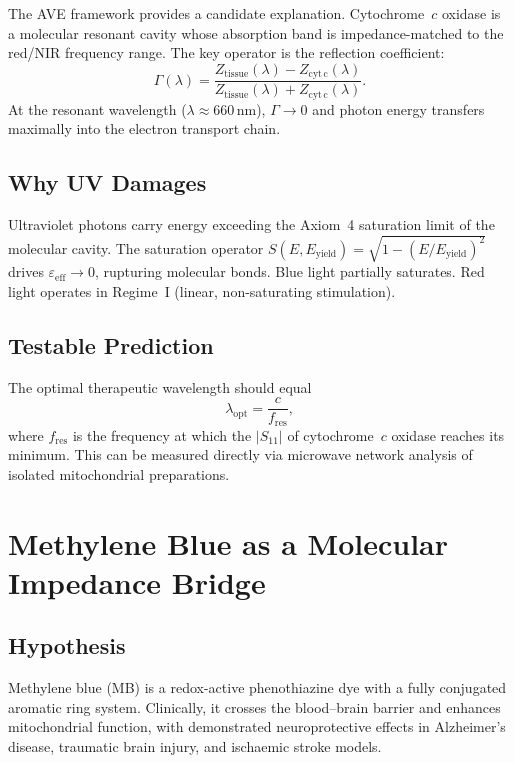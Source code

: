 The AVE framework provides a candidate explanation.  Cytochrome~$c$
oxidase is a molecular resonant cavity whose absorption band is
impedance-matched to the red/NIR frequency range.  The key operator
is the reflection coefficient:
\begin{equation}
  \Gamma(\lambda)
  = \frac{Z_{\mathrm{tissue}}(\lambda) - Z_{\mathrm{cyt\,c}}(\lambda)}
         {Z_{\mathrm{tissue}}(\lambda) + Z_{\mathrm{cyt\,c}}(\lambda)}.
\end{equation}
At the resonant wavelength ($\lambda \approx 660$\,nm), $\Gamma
\to 0$ and photon energy transfers maximally into the electron
transport chain.

\subsection{Why UV Damages}

Ultraviolet photons carry energy exceeding the Axiom~4 saturation
limit of the molecular cavity.  The saturation operator
$S(E, E_{\mathrm{yield}}) = \sqrt{1 - (E/E_{\mathrm{yield}})^2}$
drives $\varepsilon_{\mathrm{eff}} \to 0$, rupturing molecular
bonds.  Blue light partially saturates.  Red light operates in
Regime~I (linear, non-saturating stimulation).

\subsection{Testable Prediction}

The optimal therapeutic wavelength should equal
\begin{equation}
  \lambda_{\mathrm{opt}} 
  = \frac{c}{f_{\mathrm{res}}},
\end{equation}
where $f_{\mathrm{res}}$ is the frequency at which the
$|S_{11}|$ of cytochrome~$c$ oxidase reaches its minimum.  This
can be measured directly via microwave network analysis of isolated
mitochondrial preparations.


\section{Methylene Blue as a Molecular Impedance Bridge}
\label{sec:methylene_blue}

\subsection{Hypothesis}

Methylene blue (MB) is a redox-active phenothiazine dye with a
fully conjugated aromatic ring system.  Clinically, it crosses the
blood--brain barrier and enhances mitochondrial function, with
demonstrated neuroprotective effects in Alzheimer's disease,
traumatic brain injury, and ischaemic stroke models.

